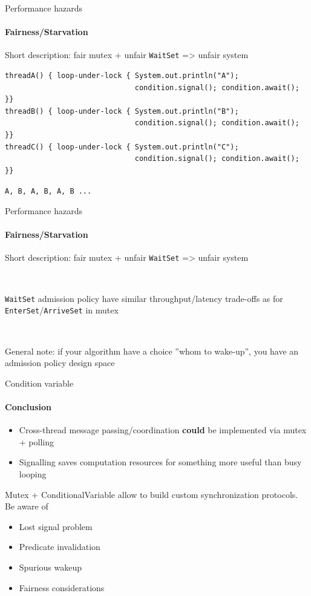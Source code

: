 \begin{frame}[t,fragile]{Performance hazards}
\framesubtitle{Fairness/Starvation}

Short description: fair mutex + unfair \texttt{WaitSet} => unfair system

\begin{verbatim}
threadA() { loop-under-lock { System.out.println("A");
                              condition.signal(); condition.await();
}}
threadB() { loop-under-lock { System.out.println("B");
                              condition.signal(); condition.await();
}}
threadC() { loop-under-lock { System.out.println("C");
                              condition.signal(); condition.await();
}}
\end{verbatim}

\pause
\texttt{A, B, A, B, A, B ...}

\end{frame}


\begin{frame}{Performance hazards}
\framesubtitle{Fairness/Starvation}

Short description: fair mutex + unfair \texttt{WaitSet} => unfair system

\
\

\texttt{WaitSet} admission policy have similar throughput/latency trade-offs as for \texttt{EnterSet}/\texttt{ArriveSet} in mutex

\
\

General note: if your algorithm have a choice ''whom to wake-up'', you have an admission policy design space
\end{frame}

\begin{frame}{Condition variable}
\framesubtitle{Conclusion}

\begin{itemize}
    \item Cross-thread message passing/coordination \textbf{could} be implemented via mutex + polling
    \item Signalling saves computation resources for something more useful than busy looping
\end{itemize}

Mutex + ConditionalVariable allow to build custom synchronization protocols. Be aware of
\begin{itemize}
    \item Lost signal problem
    \item Predicate invalidation
    \item Spurious wakeup
    \item Fairness considerations
\end{itemize}
\end{frame}

